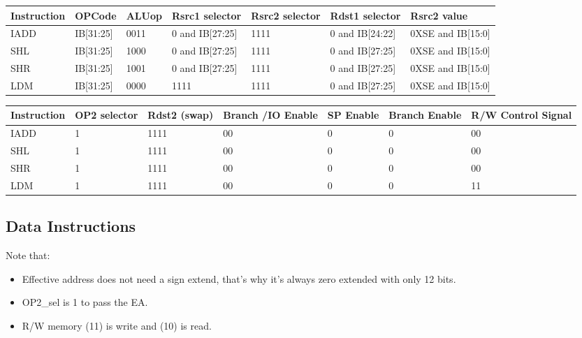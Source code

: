 \begin{center}
\begin{tabular}{||p{20mm}| p{15mm}| p{15mm}| p{15mm}| p{15mm}| p{15mm}| p{15mm}||} 
\hline
Instruction & OPCode & ALUop & Rsrc1 selector & Rsrc2 selector & Rdst1 selector & Rsrc2 value  \\ [0.5ex] 
\hline\hline
IADD& IB[31:25] & 0011 & 0 and IB[27:25] & 1111 & 0 and IB[24:22] & 0XSE and IB[15:0] \\
\hline
SHL & IB[31:25] & 1000 & 0 and IB[27:25] & 1111 & 0 and IB[27:25] & 0XSE and IB[15:0] \\
\hline
SHR & IB[31:25] & 1001 & 0 and IB[27:25] & 1111 & 0 and IB[27:25] & 0XSE and IB[15:0] \\
\hline
LDM & IB[31:25] & 0000 & 1111 & 1111 & 0 and IB[27:25] & 0XSE and IB[15:0] \\
\hline
\end{tabular}
\end{center}

\begin{center}
\begin{tabular}{||p{20mm}| p{15mm}| p{15mm}| p{15mm}| p{15mm}| p{15mm}| p{15mm}||} 
\hline
Instruction & OP2 selector & Rdst2 (swap) & Branch /IO Enable & SP Enable & Branch Enable & R/W Control Signal  \\ [0.5ex] 
\hline\hline
IADD & 1 & 1111 & 00 & 0 & 0 & 00  \\
\hline
SHL & 1 & 1111 & 00 & 0 & 0 & 00 \\
\hline
SHR & 1 & 1111 & 00 & 0 & 0 & 00 \\
\hline
LDM & 1 & 1111 & 00 & 0 & 0 & 11 \\
\hline
\end{tabular}
\end{center}

\subsection{Data Instructions}
Note that:
\begin{itemize}
    \item Effective address does not need a sign extend, that's why it's always zero extended with only 12 bits.
    \item OP2\_sel is 1 to pass the EA.
    \item R/W memory (11) is write and (10) is read.
\end{itemize}

